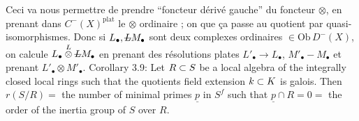 Ceci va nous permettre de prendre  ``foncteur dérivé gauche'' du foncteur $\otimes$, en prenant dans $C^-(X)^{\mathrm{plat}}$ le $\otimes$ ordinaire ; on  que ça passe au quotient par quasi-isomorphismes. Donc si $L_{\bullet},\deleted{L}M_{\bullet}$ sont deux complexes ordinaires $\in\mathrm{Ob}\,D^-(X)$, on  calcule $L_{\bullet}\overset{L}{\otimes}\deleted{L}M_{\bullet}$ en prenant des résolutions plates $L'_{\bullet}\longrightarrow{}L_{\bullet}$, $M'_{\bullet}\mathbin{-}M_{\bullet}$ et prenant $L'_{\bullet}\otimes M'_{\bullet}$.
Corollary 3.9: Let $R\subset S$ be a local algebra of the integrally closed local rings such that the quotients field extension $k\subset K$ is galois. Then $r(S/R)={}$ the number of minimal primes $\underline p$ in $S^f$ such that $\underline p\cap R=0={}$ the order of the inertia group of $S$ over $R$.

